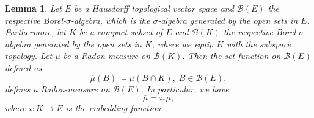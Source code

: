 \documentclass[11pt,a4paper,twoside,openany]{report}
\numberwithin{equation}{section}
\theoremstyle{plain} %
\newtheorem{lemma}[theorem]{Lemma}
\theoremstyle{definition} %
\theoremstyle{remark} %
\begin{document}
\begin{lemma}\label{lemma:radon measures on compact subspaces}
 Let \(E\) be a Hausdorff topological vector space and \(\mathcal{B}(E)\) the respective Borel-\(\sigma\)-algebra, which is the \(\sigma\)-algebra generated by the open sets in \(E\). Furthermore, let \(K\) be a compact subset of \(E\) and \(\mathcal{B}(K)\) the respective Borel-\(\sigma\)-algebra generated by the open sets in \(K\), where we equip \(K\) with the subspace topology. Let \(\mu\) be a Radon-measure on \(\mathcal{B}(K)\). Then the set-function on \(\mathcal{B}(E)\)
 defined as
 \begin{equation*}
     \overline{\mu}(B)\coloneqq \mu(B\cap K),\;B\in\mathcal{B}(E),
 \end{equation*}
 defines a Radon-measure on \(\mathcal{B}(E)\). In particular, we have 
 \begin{equation}\label{eq:inclusion mapping}
     \overline{\mu}=i_*\mu,
 \end{equation}
 where \(i:K\to E\) is the embedding function.
\end{lemma}
\end{document}
